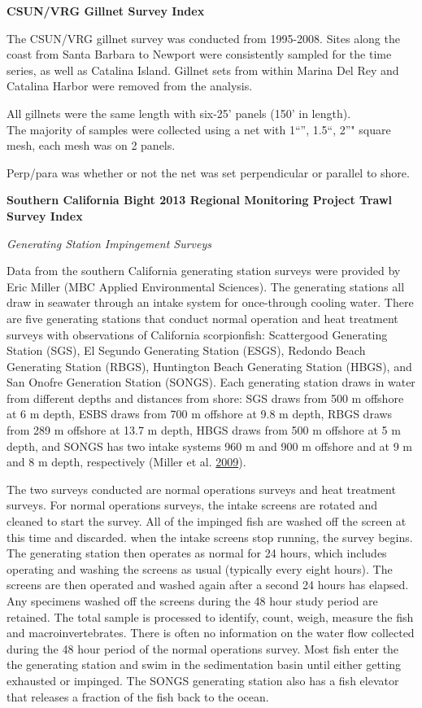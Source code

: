 \documentclass[12pt,]{article}
\begin{document}
\textbf{CSUN/VRG Gillnet Survey Index}

The CSUN/VRG gillnet survey was conducted from 1995-2008. Sites along
the coast from Santa Barbara to Newport were consistently sampled for
the time series, as well as Catalina Island. Gillnet sets from within
Marina Del Rey and Catalina Harbor were removed from the analysis.

All gillnets were the same length with six-25' panels (150' in
length).\\
The majority of samples were collected using a net with 1``'', 1.5``,
2''" square mesh, each mesh was on 2 panels.

Perp/para was whether or not the net was set perpendicular or parallel
to shore.

\textbf{Southern California Bight 2013 Regional Monitoring Project Trawl
Survey Index}

\emph{Generating Station Impingement Surveys}

Data from the southern California generating station surveys were
provided by Eric Miller (MBC Applied Environmental Sciences). The
generating stations all draw in seawater through an intake system for
once-through cooling water. There are five generating stations that
conduct normal operation and heat treatment surveys with observations of
California scorpionfish: Scattergood Generating Station (SGS), El
Segundo Generating Station (ESGS), Redondo Beach Generating Station
(RBGS), Huntington Beach Generating Station (HBGS), and San Onofre
Generation Station (SONGS). Each generating station draws in water from
different depths and distances from shore: SGS draws from 500 m offshore
at 6 m depth, ESBS draws from 700 m offshore at 9.8 m depth, RBGS draws
from 289 m offshore at 13.7 m depth, HBGS draws from 500 m offshore at 5
m depth, and SONGS has two intake systems 960 m and 900 m offshore and
at 9 m and 8 m depth, respectively (Miller et al.
\protect\hyperlink{ref-Miller2009}{2009}).

The two surveys conducted are normal operations surveys and heat
treatment surveys. For normal operations surveys, the intake screens are
rotated and cleaned to start the survey. All of the impinged fish are
washed off the screen at this time and discarded. when the intake
screens stop running, the survey begins. The generating station then
operates as normal for 24 hours, which includes operating and washing
the screens as usual (typically every eight hours). The screens are then
operated and washed again after a second 24 hours has elapsed. Any
specimens washed off the screens during the 48 hour study period are
retained. The total sample is processed to identify, count, weigh,
measure the fish and macroinvertebrates. There is often no information
on the water flow collected during the 48 hour period of the normal
operations survey. Most fish enter the the generating station and swim
in the sedimentation basin until either getting exhausted or impinged.
The SONGS generating station also has a fish elevator that releases a
fraction of the fish back to the ocean.
\end{document}
